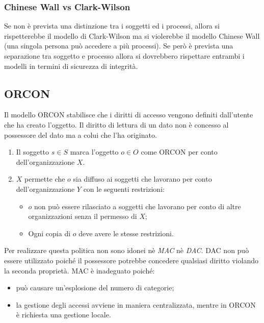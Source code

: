 \subsubsection{Chinese Wall vs Clark-Wilson}

Se non è prevista una distinzione tra i soggetti
ed i processi, allora si rispetterebbe il modello
di Clark-Wilson ma si violerebbe il modello
Chinese Wall (una singola persona può
accedere a più processi). Se però è prevista
una separazione tra soggetto e processo allora
si dovrebbero rispettare entrambi i modelli in
termini di sicurezza di integrità.

\subsection{ORCON \normalfont{}}

Il modello ORCON stabilisce che i diritti di accesso vengono definiti
dall'utente che ha creato l'oggetto. Il diritto di lettura di un dato non è
concesso al possessore del dato ma a colui che l'ha
originato.

\begin{enumerate}
      \item Il soggetto \(s \in S\) marca l'oggetto \(o \in O\) come ORCON per
            conto dell'organizzazione \(X\).
      \item \(X\) permette che \(o\) sia diffuso ai soggetti che lavorano per
            conto dell'organizzazione \(Y\) con le seguenti restrizioni:
            \begin{itemize}
                  \item \(o\) non può essere rilasciato a soggetti che lavorano per
                        conto di altre organizzazioni senza il permesso di \(X\);
                  \item Ogni copia di \(o\) deve avere le stesse restrizioni.
            \end{itemize}
\end{enumerate}

Per realizzare questa politica non sono idonei nè \textit{MAC} nè \textit{DAC}.
DAC non può essere utilizzato poiché il possessore potrebbe concedere qualsiasi
diritto violando la seconda proprietà.
MAC è inadeguato poiché:

\begin{itemize}
      \item può causare un'esplosione del numero di categorie;
      \item la gestione degli accessi avviene in maniera centralizzata,
            mentre in ORCON è richiesta
            una gestione locale.
\end{itemize}

